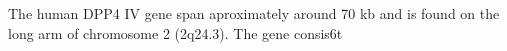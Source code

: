 The human DPP4 IV gene span aproximately around 70 kb and is found on the long arm of chromosome 2 (2q24.3). The gene consis6t